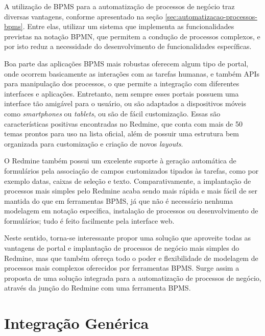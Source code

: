 A utilização de BPMS para a automatização de processos de negócio traz diversas vantagens, conforme apresentado na seção \ref{sec:automatizacao-processos-bpms}. Entre elas, utilizar um sistema que implementa as funcionalidades previstas na notação BPMN, que permitem a condução de processos complexos, e por isto reduz a necessidade do desenvolvimento de funcionalidades específicas. 

Boa parte das aplicações BPMS mais robustas oferecem algum tipo de portal, onde ocorrem basicamente as interações com as tarefas humanas, e também APIs para manipulação dos processos, o que permite a integração com diferentes interfaces e aplicações. Entretanto, nem sempre esses portais possuem uma interface tão amigável para o usuário, ou são adaptados a dispositivos móveis como \textit{smartphones} ou \textit{tablets}, ou são de fácil customização. Essas são características positivas encontradas no Redmine, que conta com mais de 50 temas prontos para uso na lista oficial\cite{redmine_themes}, além de possuir uma estrutura bem organizada para customização e criação de novos \textit{layouts}. 

O Redmine também possui um excelente suporte à geração automática de formulários pela associação de campos customizados tipados às tarefas, como por exemplo datas, caixas de seleção e texto. Comparativamente, a implantação de processos mais simples pelo Redmine acaba sendo mais rápida e mais fácil de ser mantida do que em ferramentas BPMS, já que não é necessário nenhuma modelagem em notação específica, instalação de processos ou desenvolvimento de formulários; tudo é feito facilmente pela interface web. 

Neste sentido, torna-se interessante propor uma solução que aproveite todas as vantagens de portal e implantação de processos de negócio mais simples do Redmine, mas que também ofereça todo o poder e flexibilidade de modelagem de processos mais complexos oferecidos por ferramentas BPMS. Surge assim a proposta de uma solução integrada para a automatização de processos de negócio, através da junção do Redmine com uma ferramenta BPMS.

\section{Integração Genérica}\label{sec:cenario-integracao-genérica}

